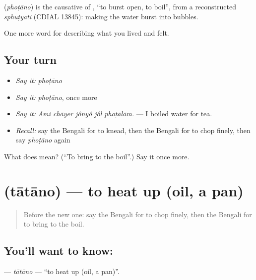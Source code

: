 \begin{cousinweb}
\textbf{} (\emph{phoṭāno}) is the causative of , \textquotedblleft{}to burst open, to boil\textquotedblright{}, from a reconstructed \emph{sphuṭyati} (CDIAL 13845): making the water burst into bubbles.
\end{cousinweb}

\begin{grammarlens}[title={What you've built}]
One more word for describing what you lived and felt.
\end{grammarlens}

\subsection*{Your turn}
\begin{itemize}
\raggedright
  \item \emph{Say it:} \emph{phoṭāno}
  \item \emph{Say it:} \emph{phoṭāno}, once more
  \item \emph{Say it:} \emph{Āmi chāyer jônyô jôl phoṭālām.} — I boiled water for tea.
  \item \emph{Recall:} say the Bengali for to knead, then the Bengali for to chop finely, then say \emph{phoṭāno} again
\end{itemize}

\begin{tcolorbox}[breakable,colback=teal!4,colframe=teal!35!black,title={Before you move on}]
What does  mean? (\textquotedblleft{}To bring to the boil\textquotedblright{}.) Say it once more.
\end{tcolorbox}
\section[\texorpdfstring{\bn{তাতানো} (tātāno)}{তাতানো (tātāno)}]{ (tātāno) — to heat up (oil, a pan)}

\label{lesson:BN-C514-tatano}



\begin{quote}
Before the new one: say the Bengali for to chop finely, then the Bengali for to bring to the boil.
\end{quote}

\subsection*{You'll want to know: }
\textbf{} — \emph{tātāno} — \textquotedblleft{}to heat up (oil, a pan)\textquotedblright{}.

